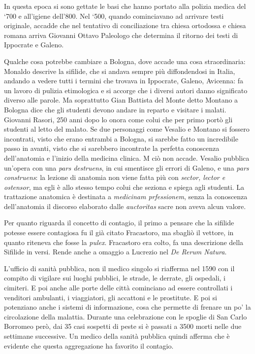 \documentclass[]{article}
\begin{document}
In questa epoca si sono gettate le basi che hanno portato alla polizia
medica del `700 e all'igiene dell'800. Nel `500, quando cominciavano ad
arrivare testi originale, accadde che nel tentativo di conciliazione tra
chiesa ortodossa e chiesa romana arriva Giovanni Ottavo Paleologo che
determina il ritorno dei testi di Ippocrate e Galeno.

Qualche cosa potrebbe cambiare a Bologna, dove accade una cosa
straordinaria: Monaldo descrive la sifilide, che si andava sempre più
diffondendosi in Italia, andando a vedere tutti i termini che trovava in
Ippocrate, Galeno, Avicenna: fa un lavoro di pulizia etimologica e si
accorge che i diversi autori danno significato diverso alle parole. Ma
soprattutto Gian Battista del Monte detto Montano a Bologna dice che gli
studenti devono andare in reparto e visitare i malati. Giovanni Rasori,
250 anni dopo lo onora come colui che per primo portò gli studenti al
letto del malato. Se due personaggi come Vesalio e Montano si fossero
incontrati, visto che erano entrambi a Bologna, si sarebbe fatto un
incredibile passo in avanti, visto che si sarebbero incontrate la
perfetta conoscenza dell'anatomia e l'inizio della medicina clinica. M
ciò non accade. Vesalio pubblica un'opera con una \emph{pars destruens},
in cui smentisce gli errori di Galeno, e una \emph{pars construens}: la
lezione di anatomia non viene fatta più con \emph{sector, lector e
ostensor}, ma egli è allo stesso tempo colui che seziona e spiega agli
studenti. La trattazione anatomica è destinata a \emph{medicinam
prfessionem}, senza la conoscenza dell'anatomia il discorso elaborato
dalle \emph{auctoritas} sacre non aveva alcun valore.

Per quanto riguarda il concetto di contagio, il primo a pensare che la
sifilide potesse essere contagiosa fu il già citato Fracastoro, ma
sbagliò il vettore, in quanto riteneva che fosse la \emph{pulex}.
Fracastoro era colto, fa una descrizione della Sifilide in versi. Rende
anche a omaggio a Lucrezio nel \emph{De Rerum Natura}.

L'ufficio di sanità pubblica, non il medico singolo si riafferma nel
1590 con il compito di vigilare sui luoghi pubblici, le strade, le
derrate, gli ospedali, i cimiteri. E poi anche alle porte delle città
cominciano ad essere controllati i venditori ambulanti, i viaggiatori,
gli accattoni e le prostitute. E poi si potenziano anche i sistemi di
informazione, cosa che permette di frenare un po' la circolazione della
malattia. Durante una celebrazione con le spoglie di San Carlo Borromeo
però, dai 35 casi sospetti di peste si è passati a 3500 morti nelle due
settimane successive. Un medico della sanità pubblica quindi afferma che
è evidente che questa aggregazione ha favorito il contagio.
\end{document}
